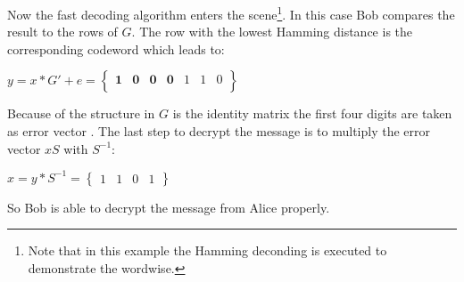 Now the fast decoding algorithm enters the scene\footnote{Note that in this example the Hamming deconding is executed to demonstrate the wordwise.}. In this case Bob compares the result to the rows of $G$. The row with the lowest Hamming distance  is the corresponding codeword which leads to: 
\begin{center}
	$
	y = x*G'+e =
	\begin{Bmatrix}
	\textbf{1} & \textbf{0} & \textbf{0} & \textbf{0} & 1 & 1 & 0 \\
	\end{Bmatrix}
	$
\end{center}
Because of the structure in $G$ is the identity matrix  the first four digits are taken as error vector .
The last step to decrypt the message is to multiply the error vector $xS$ with $S^{-1}$:
\begin{center}
$
x = y * S^{-1} = 	
\begin{Bmatrix}
	1 & 1 & 0 & 1
\end{Bmatrix}
$
\end{center}
So Bob is able to decrypt the message from Alice properly. 

